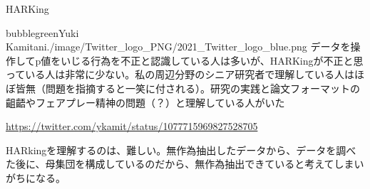 


\begin{SMbox}{HARKing}
    \begin{rightbubbles}{bubblegreen}{Yuki Kamitani}{./image/Twitter_logo_PNG/2021_Twitter_logo_blue.png}
    データを操作してp値をいじる行為を不正と認識している人は多いが、HARKingが不正と思っている人は非常に少ない。私の周辺分野のシニア研究者で理解している人はほぼ皆無（問題を指摘すると一笑に付される）。研究の実践と論文フォーマットの齟齬やフェアプレー精神の問題（？）と理解している人がいた
        \begin{flushright} 
            \small	\url{https://twitter.com/ykamit/status/1077715969827528705}
        \end{flushright}    
    \end{rightbubbles}
    
    HARkingを理解するのは、難しい。無作為抽出したデータから、データを調べた後に、母集団を構成しているのだから、無作為抽出できていると考えてしまいがちになる。
\end{SMbox}
 


